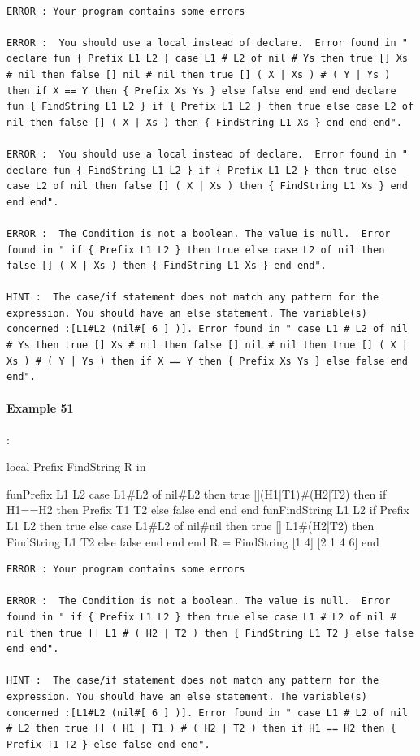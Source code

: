 \documentclass[11pt,a4paper,twoside,openright]{report}
\begin{document}
\begin{lstlisting}

ERROR : Your program contains some errors

ERROR :  You should use a local instead of declare.  Error found in " declare fun { Prefix L1 L2 } case L1 # L2 of nil # Ys then true [] Xs # nil then false [] nil # nil then true [] ( X | Xs ) # ( Y | Ys ) then if X == Y then { Prefix Xs Ys } else false end end end declare fun { FindString L1 L2 } if { Prefix L1 L2 } then true else case L2 of nil then false [] ( X | Xs ) then { FindString L1 Xs } end end end".

ERROR :  You should use a local instead of declare.  Error found in " declare fun { FindString L1 L2 } if { Prefix L1 L2 } then true else case L2 of nil then false [] ( X | Xs ) then { FindString L1 Xs } end end end".

ERROR :  The Condition is not a boolean. The value is null.  Error found in " if { Prefix L1 L2 } then true else case L2 of nil then false [] ( X | Xs ) then { FindString L1 Xs } end end".

HINT :  The case/if statement does not match any pattern for the expression. You should have an else statement. The variable(s) concerned :[L1#L2 (nil#[ 6 ] )]. Error found in " case L1 # L2 of nil # Ys then true [] Xs # nil then false [] nil # nil then true [] ( X | Xs ) # ( Y | Ys ) then if X == Y then { Prefix Xs Ys } else false end end".

\end{lstlisting}


\paragraph{Example 51}:

\begin{OZ}

local Prefix FindString R in
	
fun{Prefix L1 L2}
    case L1#L2 of nil#L2 then true
    [](H1|T1)#(H2|T2) then 
        if H1==H2 then {Prefix T1 T2}
        else false
        end
    end
end
fun{FindString L1 L2}
    if {Prefix L1 L2} then true 
    else 
        case L1#L2 of nil#nil then true
        [] L1#(H2|T2) then {FindString L1 T2}
        else false
        end
    end
end
R = {FindString [1 4] [2 1 4 6]}
end

\end{OZ}

\begin{lstlisting}
ERROR : Your program contains some errors

ERROR :  The Condition is not a boolean. The value is null.  Error found in " if { Prefix L1 L2 } then true else case L1 # L2 of nil # nil then true [] L1 # ( H2 | T2 ) then { FindString L1 T2 } else false end end".

HINT :  The case/if statement does not match any pattern for the expression. You should have an else statement. The variable(s) concerned :[L1#L2 (nil#[ 6 ] )]. Error found in " case L1 # L2 of nil # L2 then true [] ( H1 | T1 ) # ( H2 | T2 ) then if H1 == H2 then { Prefix T1 T2 } else false end end".

\end{lstlisting}
\end{document}
